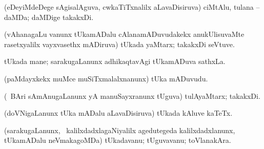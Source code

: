 \bentry
{} 
\gl{\nA}
\expl{}
\bmng
(eDeyiMdeDege sAgisalAguva, cwkaTiTxnalilx aLavaDisiruva) ciMtAlu, tulana -- daMDa; daMDige takakxDi. 
\emng
\eentry

\bentry
{} 
\gl{\nA}
\expl{}
\bmng
(vAhanagaLu \mo vanunx tUkamADalu cAlanamADuvudakekx anukUlisuvaMte rasetxyalilx vayxvasethx mADiruva) tUkada yaMtarx; takakxDi seVtuve. 
\emng
\eentry

\bentry
{} 
\gl{\nA}
\expl{}
\bmng
tUkada mane; sarakugaLanunx adhikaqtavAgi tUkamADuva sathxLa. 
\emng
\eentry

\bentry
{} 
\gl{\nA}
\expl{}
\bmng
(paMdayxkekx muMce muSiTxmalalxnanunx) tUka mADuvudu. 
\emng
\eentry

\bentry
{} 
\gl{\nA}
\expl{}
\bmng
(\sA\ BAri sAmAnugaLanunx yA manuSayxranunx tUguva) tulAyaMtarx; takakxDi. 
\emng
\eentry

\bentry
{} 
\gl{\nA}
\expl{}
\bmng
(doVNigaLanunx tUka mADalu aLavaDisiruva) tUkada kAluve kaTeTx. 
\emng
\eentry

\bentry
{} 
\gl{\nA}
\expl{}
\bmng
(sarakugaLanunx, \kanmu\ kalilxdadxlagaNiyalilx agedutegeda kalilxdadxlanunx, tUkamADalu neVmakagoMDa) tUkadavanu; tUguvavanu; toVlanakAra. 
\emng
\eentry

